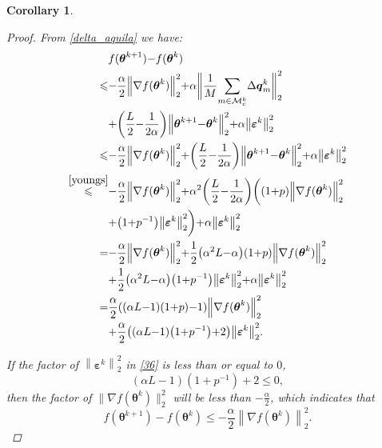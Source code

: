 \documentclass[lettersize,journal]{IEEEtran}
\newtheorem{corollary}{Corollary}
\begin{document}
\begin{corollary}
\begin{proof}
    From \eqref{delta_aquila} we have:
    \begin{equation}
    \thinmuskip=0mu
    \medmuskip=-0mu
    \thickmuskip=0mu
    \label{36}
    \begin{aligned}
    &f(\boldsymbol{\theta}^{k+1})-f(\boldsymbol{\theta}^k)\\
    \leqslant&-\frac{\alpha}{2}\left\|\nabla f(\boldsymbol{\theta}^k)\right\|_2^2+\alpha \bigg\|\frac{1}{M}\sum_{m \in \mathcal{M}_c^k}\Delta \boldsymbol{q}_{m}^{k}\bigg\|_2^2\\
    &+\left(\frac{L}{2}-\frac{1}{2\alpha}\right)\left\|\boldsymbol{\theta}^{k+1}-\boldsymbol{\theta}^k\right\|_2^2 +\alpha\left\|\boldsymbol{\varepsilon}^k\right\|_2^2\\
    \leqslant& -\frac{\alpha}{2}\left\|\nabla f(\boldsymbol{\theta}^k)\right\|_2^2+\left(\frac{L}{2}-\frac{1}{2\alpha}\right)\left\|\boldsymbol{\theta}^{k+1}-\boldsymbol{\theta}^k\right\|_2^2+\alpha\left\|\boldsymbol{\varepsilon}^k\right\|_2^2\\
    \overset{\eqref{youngs}}{\leqslant}&-\frac{\alpha}{2}\left\|\nabla f(\boldsymbol{\theta}^k)\right\|_2^2+\alpha^2\left(\frac{L}{2}-\frac{1}{2 \alpha}\right)\bigg((1+p)\left\|\nabla f(\boldsymbol{\theta}^k)\right\|_2^2\\
    &+\left(1+p^{-1}\right) \left\| \boldsymbol{\varepsilon}^k \right\|_2^2\bigg)+\alpha \left\| \boldsymbol{\varepsilon}^k\right\|_2^2\\
    =&-\frac{\alpha}{2}\left\|\nabla f(\boldsymbol{\theta}^k)\right\|_2^2+\frac{1}{2}\left(\alpha^2 L-\alpha\right)(1+p)\left\|\nabla f(\boldsymbol{\theta}^k)\right\|_2^2 \\
    &+\frac{1}{2}\left(\alpha^2 L-\alpha\right)\left(1+p^{-1}\right)\left\|\boldsymbol{\varepsilon}^k\right\|_2^2+\alpha\left\|\boldsymbol{\varepsilon}^k\right\|_2^2\\
    =&\frac{\alpha}{2}\left(\left(\alpha L- 1\right)(1+p)-1\right)\left\|\nabla f(\boldsymbol{\theta}^k)\right\|_2^2 \\
    &+\frac{\alpha}{2}\left((\alpha L-1)\left(1+p^{-1}\right)+2\right)\left\|\boldsymbol{\varepsilon}^k\right\|_2^2.
    \end{aligned}
    \end{equation}
    
    If the factor of $\left\|\boldsymbol{\varepsilon}^k\right\|_2^2$ in \eqref{36} is less than or equal to $0$,
    \begin{equation}
        (\alpha L-1)\left(1+p^{-1}\right)+2 \leqslant 0,
        \label{40}
    \end{equation}
    then the factor of $\|\nabla f(\boldsymbol{\theta}^k)\|_2^2$ will be less than $-\frac{\alpha}{2}$, 
    which indicates that
    \begin{equation}
    f(\boldsymbol{\theta}^{k+1})-f(\boldsymbol{\theta}^k) \leqslant -\frac{\alpha}{2}\left\|\nabla f(\boldsymbol{\theta}^k)\right\|_2^2.
    \end{equation}


\end{proof}
\end{corollary}
\end{document}
